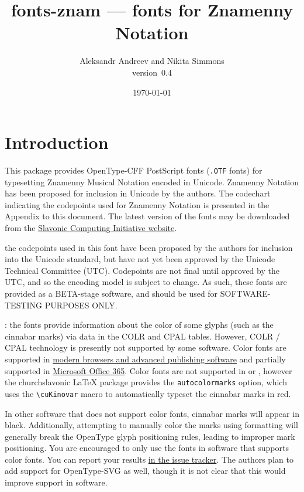 \documentclass[11pt]{article}
\def\fileversion{0.4}
\def\pkg#1{\textsf{#1}}
\def\cs#1{\texttt{\textbackslash #1}}
\begin{document}
\title{\pkg{fonts-znam} --- fonts for Znamenny Notation}
\author{Aleksandr Andreev and Nikita Simmons\\version~\fileversion}
\date{\today}
\maketitle

\tableofcontents

\section{Introduction}
This package provides OpenType-CFF PostScript fonts (\texttt{.OTF} fonts)
for typesetting Znamenny Musical Notation encoded in Unicode. Znamenny
Notation has been proposed for inclusion in Unicode by the authors.
The codechart indicating the codepoints used for Znamenny Notation
is presented in the Appendix to this document. The latest version of
the fonts may be downloaded from the \href{https://sci.ponomar.net/music.html}
{Slavonic Computing Initiative website}.

 the codepoints used in this font have been proposed
by the authors for inclusion into the Unicode standard, but have not yet
been approved by the Unicode Technical Committee (UTC). Codepoints are not
final until approved by the UTC, and so the encoding model is subject to change.
As such, these fonts are provided as a BETA-stage software, and should be used
for SOFTWARE-TESTING PURPOSES ONLY.

: the fonts provide information about the color of some
glyphs (such as the cinnabar marks) via data in the COLR and CPAL tables.
However, COLR / CPAL technology is presently not supported by some software.
Color fonts are supported in \href{https://www.colorfonts.wtf/}{modern browsers
and advanced publishing software} and partially supported in
\href{https://office-watch.com/2019/color-font-support-in-microsoft-office-the-story-so-far/}{Microsoft
Office 365}. Color fonts are not supported in \XeTeX{} or \LuaTeX{}, however
the \pkg{churchslavonic} \LaTeX{} package provides the \texttt{autocolormarks} option,
which uses the \cs{cuKinovar} macro to automatically typeset the cinnabar marks in red.

In other software that does not support color fonts, cinnabar marks will appear in black.
Additionally, attempting to manually color the marks using formatting will generally
break the OpenType glyph positioning rules, leading to improper mark positioning.
You are encouraged to only use the fonts in software that supports color fonts. You
can report your results \href{https://github.com/slavonic/fonts-znam/issues/19}{in
the issue tracker}. The authors plan to add support for OpenType-SVG as well, though
it is not clear that this would improve support in software.
\end{document}
